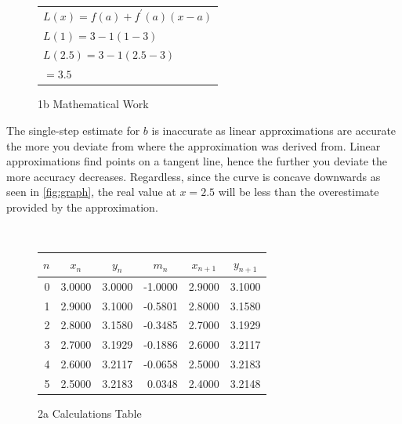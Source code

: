 \documentclass[answers,addpoints]{exam}
\begin{document}
\begin{questions}
\begin{solution}
    \begin{figure}[H]
      \centering
      \begin{tabular}{@{}l@{}}
        $\displaystyle L(x)=f(a)+f^\prime(a)(x-a)$ \\[6pt]
        $\displaystyle L(1)=3-1(1-3)$ \\[6pt]
        $\displaystyle L(2.5)=3-1(2.5-3)$ \\[6pt]
        $\displaystyle =3.5$ \\
      \end{tabular}
      \caption{1b Mathematical Work}
      \label{fig:1b-math}
    \end{figure}

    The single-step estimate for $b$ is inaccurate as linear approximations are accurate the more you deviate from where the approximation was derived from. Linear approximations find points on a tangent line, hence the further you deviate the more accuracy decreases. Regardless, since the curve is concave downwards as seen in \ref{fig:graph}, the real value at $x=2.5$ will be less than the overestimate provided by the approximation.

  \end{solution}


  \question \
  \begin{solution}

    \begin{figure}[H]
      \centering
      \begin{tabular}{r r r r r r}
        \hline
        \multicolumn{1}{c}{$n$} &
        \multicolumn{1}{c}{$x_n$} &
        \multicolumn{1}{c}{$y_n$} &
        \multicolumn{1}{c}{$m_n$} &
        \multicolumn{1}{c}{$x_{n+1}$} &
        \multicolumn{1}{c}{$y_{n+1}$} \\
        \hline
        0 & 3.0000 & 3.0000 & -1.0000 & 2.9000 & 3.1000 \\
        1 & 2.9000 & 3.1000 & -0.5801 & 2.8000 & 3.1580 \\
        2 & 2.8000 & 3.1580 & -0.3485 & 2.7000 & 3.1929 \\
        3 & 2.7000 & 3.1929 & -0.1886 & 2.6000 & 3.2117 \\
        4 & 2.6000 & 3.2117 & -0.0658 & 2.5000 & 3.2183 \\
        5 & 2.5000 & 3.2183 & 0.0348 & 2.4000 & 3.2148 \\
        \hline
      \end{tabular}
      \caption{2a Calculations Table}
      \label{fig:2a-vi-table}
    \end{figure}


\end{solution}
\end{questions}
\end{document}
